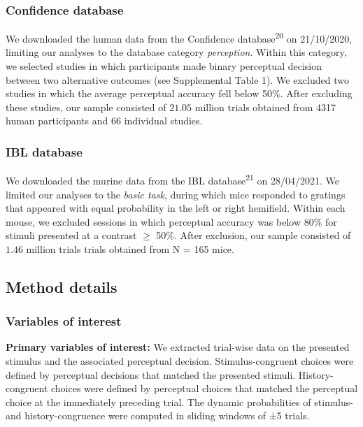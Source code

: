 \documentclass[
]{article}
\begin{document}
\hypertarget{confidence-database}{%
\subsubsection{Confidence database}\label{confidence-database}}

We downloaded the human data from the Confidence
database\textsuperscript{20} on 21/10/2020, limiting our analyses to the
database category \emph{perception}. Within this category, we selected
studies in which participants made binary perceptual decision between
two alternative outcomes (see Supplemental Table 1). We excluded two
studies in which the average perceptual accuracy fell below 50\%. After
excluding these studies, our sample consisted of \(21.05\) million
trials obtained from 4317 human participants and 66 individual studies.

\hypertarget{ibl-database}{%
\subsubsection{IBL database}\label{ibl-database}}

We downloaded the murine data from the IBL database\textsuperscript{21}
on 28/04/2021. We limited our analyses to the \emph{basic task}, during
which mice responded to gratings that appeared with equal probability in
the left or right hemifield. Within each mouse, we excluded sessions in
which perceptual accuracy was below 80\% for stimuli presented at a
contrast \(\geq\) 50\%. After exclusion, our sample consisted of
\(1.46\) million trials trials obtained from N = 165 mice.

\hypertarget{method-details}{%
\subsection{Method details}\label{method-details}}

\hypertarget{variables-of-interest}{%
\subsubsection{Variables of interest}\label{variables-of-interest}}

\textbf{Primary variables of interest:} We extracted trial-wise data on
the presented stimulus and the associated perceptual decision.
Stimulus-congruent choices were defined by perceptual decisions that
matched the presented stimuli. History-congruent choices were defined by
perceptual choices that matched the perceptual choice at the immediately
preceding trial. The dynamic probabilities of stimulus- and
history-congruence were computed in sliding windows of ±5 trials.
\end{document}
